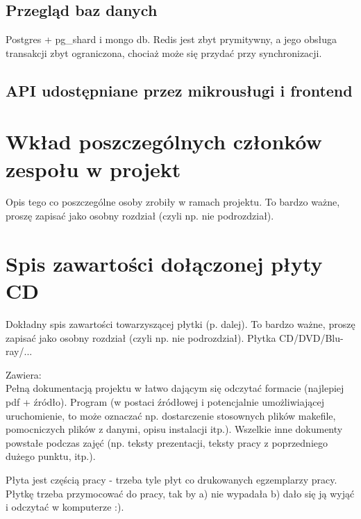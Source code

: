 \documentclass[licencjacka]{pracamgr}
\begin{document}
\section{Przegląd baz danych}
Postgres + pg\_shard i mongo db. Redis jest zbyt prymitywny, a jego obsługa transakcji zbyt ograniczona, chociaż
może się przydać przy synchronizacji.
\section{API udostępniane przez mikrousługi i frontend}

\chapter{Wkład poszczególnych członków zespołu w projekt}\label{r:wklad}
Opis tego co poszczególne osoby zrobiły w ramach projektu. To bardzo ważne, proszę zapisać jako osobny rozdział (czyli np. nie podrozdział).

\appendix
\chapter{Spis zawartości dołączonej płyty CD}\label{r:spis}
Dokładny spis zawartości towarzyszącej płytki (p. dalej). To bardzo ważne, proszę zapisać jako osobny rozdział (czyli np. nie podrozdział). Płytka CD/DVD/Blu-ray/...

Zawiera:\\
Pełną dokumentacją projektu w łatwo dającym się odczytać formacie (najlepiej pdf + źródło).
Program (w postaci źródłowej i potencjalnie umożliwiającej uruchomienie, to może oznaczać np. dostarczenie stosownych plików makefile, pomocniczych plików z danymi, opisu instalacji itp.).
Wszelkie inne dokumenty powstałe podczas zajęć (np. teksty prezentacji, teksty pracy z poprzedniego dużego punktu, itp.).

Płyta jest częścią pracy - trzeba tyle płyt co drukowanych egzemplarzy pracy. Płytkę trzeba przymocować do pracy, tak by a) nie wypadała b) dało się ją wyjąć i odczytać w komputerze :).
\end{document}

